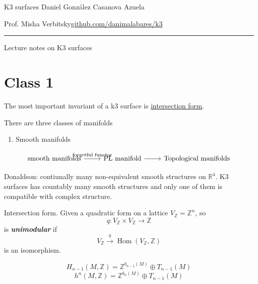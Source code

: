 




\begin{minipage}{\textwidth}
	\begin{minipage}{1\textwidth}
		K3 surfaces \hfill Daniel González Casanova Azuela
		
		{\small Prof. Misha Verbitsky\hfill\href{https://github.com/danimalabares/k3}{github.com/danimalabares/k3}}
	\end{minipage}
\end{minipage}\vspace{.2cm}\hrule

\vspace{1em}
{\Huge Lecture notes on K3 surfaces}

\tableofcontents

\section{Class 1}

The most important invariant of a k3 surface is \href{https://en.wikipedia.org/wiki/Intersection_form_of_a_4-manifold}{intersection form}.

There are three classes of manifolds
\begin{enumerate}
	\item Smooth manifolds
\end{enumerate}

\[\begin{tikzcd}
	\text{smooth manifolds}\arrow[r,"\text{forgetful functor} "]&\text{PL manifold}\arrow[r]&\text{Topological manifolds}   
\end{tikzcd}\]

Donaldson: contiunally many non-equivalent smooth structures on $\mathbb{R}^{4}$. K3 surfaces has countably many smooth structures and only one of them is compatible with complex structure.

\begin{defn}
	Intersection form. Given a quadratic form on a lattice $V_{\mathbb{Z}}=\mathbb{Z}^n$, so 
	 \[q:V_{\mathbb{Z}}\times V_{\mathbb{Z}}\to \mathbb{Z}\]
	 is \textit{\textbf{unimodular}} if 
	 \[V_{\mathbb{Z}}\overset{q}{\longrightarrow} \operatorname{Hom}(V_{\mathbb{Z}},\mathbb{Z})\]
	 is an isomorphism.
\end{defn}

\begin{thm}\leavevmode
	\[H_{n-1}(M,\mathbb{Z})=\mathbb{Z}^{b_{n-1}(M)}\oplus T_{n-1}(M)\]
	\[h^n(M,\mathbb{Z})=\mathbb{Z}^{b_{n}(M)}\oplus T_{n-1}(M)\]
\end{thm}

